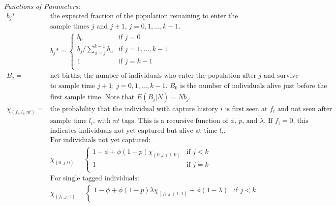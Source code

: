 \documentclass[]{article}
\begin{document}
\emph{Functions of Parameters:}\\
\[
  \begin{array}{ll}
    b_j*= & \text{the expected fraction of the population remaining to enter the population that enters between}\\
    & \text{sample times $j$ and $j+1$, $j=0,1,...,k-1$.}\\
       & b_{j}* = \left\{\begin{array}{ll}
                          b_0 & \text{if $j=0$} \\
                          b_j / \sum_{u=j}^{k-1} b_u & \text{if $j=1,...,k-1$}\\
                          1 & \text{if $j=k-1$} \\
                      \end{array}\right. \\
    B_j= & \text{net births; the number of individuals who enter the population after sample time $j$ and survive}\\
    & \text{to sample time $j+1$; $j=0,1,...,k-1$. $B_0$ is the number of individuals alive just before the}\\
    & \text{first sample time. Note that $E(B_j|N)=Nb_j$. }\\
    \chi_{(f_i,l_i,nt)}= & \text{the probability that the individual with capture history $i$ is first seen at $f_i$ and not seen after}\\
    & \text{sample time $l_i$, with $nt$ tags. This is a recursive function of $\phi$, $p$, and $\lambda$. If $f_i=0$, this}\\
    & \text{indicates individuals not yet captured but alive at time $l_i$.}\\
    & \text{For individuals not yet captured:}\\
       & \chi_{(0,j,0)} = \left\{\begin{array}{ll}
                          1-\phi+\phi(1-p)\chi_{(0,j+1,0)} & \text{if $j<k$} \\
                          1 & \text{if $j=k$}\\
                      \end{array}\right. \\
    & \text{For single tagged individuals:}\\
       & \chi_{(f_i,j,1)} = \left\{\begin{array}{ll}
                          1-\phi+\phi(1-p)\lambda \chi_{(f_i,j+1,1)}+\phi(1-\lambda) & \text{if $j<k$} \\

\end{array}
\end{array}\]
\end{document}
